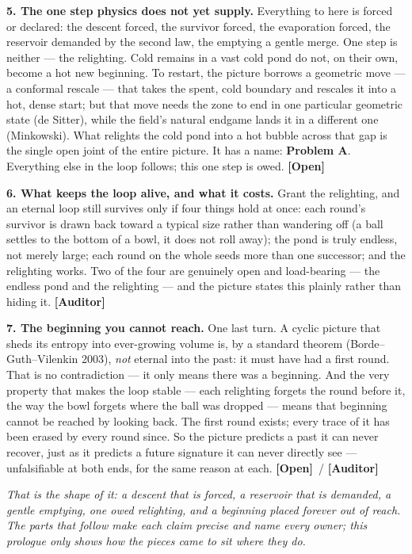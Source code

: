 \documentclass[11pt]{article}
\newcommand{\Open}{\textbf{\textcolor{gray!10!black}{[Open]}}}
\newcommand{\Auditor}{\textbf{\textcolor{teal!55!black}{[Auditor]}}}
\begin{document}
\noindent\textbf{5. The one step physics does not yet supply.} Everything to here is forced or declared: the descent forced, the survivor forced, the evaporation forced, the reservoir demanded by the second law, the emptying a gentle merge. One step is neither --- the relighting. Cold remains in a vast cold pond do not, on their own, become a hot new beginning. To restart, the picture borrows a geometric move --- a conformal rescale --- that takes the spent, cold boundary and rescales it into a hot, dense start; but that move needs the zone to end in one particular geometric state (de Sitter), while the field's natural endgame lands it in a different one (Minkowski). What relights the cold pond into a hot bubble across that gap is the single open joint of the entire picture. It has a name: \textbf{Problem A}. Everything else in the loop follows; this one step is owed. \Open

\noindent\textbf{6. What keeps the loop alive, and what it costs.} Grant the relighting, and an eternal loop still survives only if four things hold at once: each round's survivor is drawn back toward a typical size rather than wandering off (a ball settles to the bottom of a bowl, it does not roll away); the pond is truly endless, not merely large; each round on the whole seeds more than one successor; and the relighting works. Two of the four are genuinely open and load-bearing --- the endless pond and the relighting --- and the picture states this plainly rather than hiding it. \Auditor

\noindent\textbf{7. The beginning you cannot reach.} One last turn. A cyclic picture that sheds its entropy into ever-growing volume is, by a standard theorem (Borde--Guth--Vilenkin 2003), \emph{not} eternal into the past: it must have had a first round. That is no contradiction --- it only means there was a beginning. And the very property that makes the loop stable --- each relighting forgets the round before it, the way the bowl forgets where the ball was dropped --- means that beginning cannot be reached by looking back. The first round exists; every trace of it has been erased by every round since. So the picture predicts a past it can never recover, just as it predicts a future signature it can never directly see --- unfalsifiable at both ends, for the same reason at each. \Open\ / \Auditor

\medskip
\noindent\emph{That is the shape of it: a descent that is forced, a reservoir that is demanded, a gentle emptying, one owed relighting, and a beginning placed forever out of reach. The parts that follow make each claim precise and name every owner; this prologue only shows how the pieces came to sit where they do.}
\end{document}
